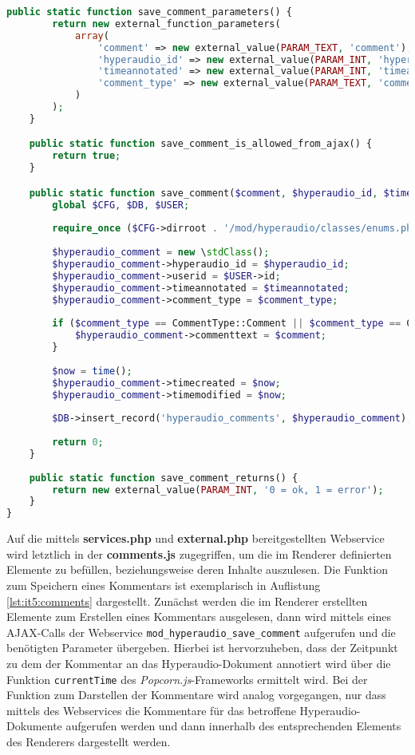 \begin{lstlisting}[language=php,
             linewidth=\textwidth,
             caption={\textbf{external.php} in der 5. Iteration},
             label={lst:it5:external}]
	public static function save_comment_parameters() {
		return new external_function_parameters(
			array(
				'comment' => new external_value(PARAM_TEXT, 'comment'),
				'hyperaudio_id' => new external_value(PARAM_INT, 'hyperaudio_id'),    
				'timeannotated' => new external_value(PARAM_INT, 'timeannotated'),
				'comment_type' => new external_value(PARAM_TEXT, 'comment_type')                                               
			)
		);
	}

	public static function save_comment_is_allowed_from_ajax() {
		return true;
	}

	public static function save_comment($comment, $hyperaudio_id, $timeannotated, $comment_type) {
		global $CFG, $DB, $USER;
        
		require_once ($CFG->dirroot . '/mod/hyperaudio/classes/enums.php');
                    
		$hyperaudio_comment = new \stdClass();
		$hyperaudio_comment->hyperaudio_id = $hyperaudio_id;
		$hyperaudio_comment->userid = $USER->id;
		$hyperaudio_comment->timeannotated = $timeannotated;
		$hyperaudio_comment->comment_type = $comment_type;
        
		if ($comment_type == CommentType::Comment || $comment_type == CommentType::Note){
			$hyperaudio_comment->commenttext = $comment;
		}
        
		$now = time();
		$hyperaudio_comment->timecreated = $now;
		$hyperaudio_comment->timemodified = $now;
        
		$DB->insert_record('hyperaudio_comments', $hyperaudio_comment);
        
		return 0;
    }
    
	public static function save_comment_returns() {
		return new external_value(PARAM_INT, '0 = ok, 1 = error');
	}
}             
\end{lstlisting}

Auf die mittels \textbf{services.php} und \textbf{external.php} bereitgestellten Webservice wird letztlich in der \textbf{comments.js} zugegriffen, um die im Renderer definierten Elemente zu befüllen, beziehungsweise deren Inhalte auszulesen. Die Funktion zum Speichern eines Kommentars ist exemplarisch in Auflistung \ref{lst:it5:comments} dargestellt. Zunächst werden die im Renderer erstellten Elemente zum Erstellen eines Kommentars ausgelesen, dann wird mittels eines AJAX-Calls der Webservice \texttt{mod_hyperaudio_save_comment} aufgerufen und die benötigten Parameter übergeben. Hierbei ist hervorzuheben, dass der Zeitpunkt zu dem der Kommentar an das Hyperaudio-Dokument annotiert wird über die Funktion \texttt{currentTime} des \textit{Popcorn.js}-Frameworks ermittelt wird. Bei der Funktion zum Darstellen der Kommentare wird analog vorgegangen, nur dass mittels des Webservices die Kommentare für das betroffene Hyperaudio-Dokumente aufgerufen werden und dann innerhalb des entsprechenden Elements des Renderers dargestellt werden.

